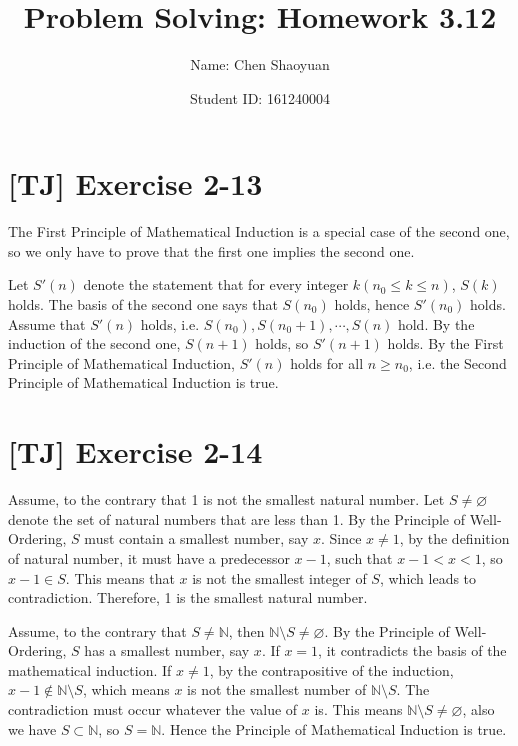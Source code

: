 \documentclass[a4paper,11pt,twocolumn]{article}
\newcommand{\homeworkno}{3.12}
\begin{document}
  \title{Problem Solving: Homework \homeworkno}
  \author{Name: Chen Shaoyuan \and Student ID: 161240004}
  \maketitle

  \section{[TJ] Exercise 2-13}
  The First Principle of Mathematical Induction is a special case of the second one, so we only have to prove that the first one implies the second one. \par
  Let $S'(n)$ denote the statement that for every integer $k (n_0 \leq k \leq n)$, $S(k)$ holds. The basis of the second one says that $S(n_0)$ holds, hence $S'(n_0)$ holds. Assume that $S'(n)$ holds, i.e. $S(n_0), S(n_0 + 1), \cdots, S(n)$ hold. By the induction of the second one, $S(n+1)$ holds, so $S'(n+1)$ holds. By the First Principle of Mathematical Induction, $S'(n)$ holds for all $n \geq n_0$, i.e. the Second Principle of Mathematical Induction is true.

  \section{[TJ] Exercise 2-14}
  Assume, to the contrary that 1 is not the smallest natural number. Let $S \neq \varnothing$ denote the set of natural numbers that are less than 1. By the Principle of Well-Ordering, $S$ must contain a smallest number, say $x$. Since $x \neq 1$, by the definition of natural number, it must have a predecessor $x-1$, such that $x-1 < x < 1$, so $x - 1 \in S$. This means that $x$ is not the smallest integer of $S$, which leads to contradiction. Therefore, 1 is the smallest natural number. \par
  Assume, to the contrary that $S \neq \mathbb{N}$, then $\mathbb{N} \setminus S \neq \varnothing$. By the Principle of Well-Ordering, $S$ has a smallest number, say $x$. If $x = 1$, it contradicts the basis of the mathematical induction. If $x \neq 1$, by the contrapositive of the induction, $x-1 \notin \mathbb{N} \setminus S$, which means $x$ is not the smallest number of $\mathbb{N} \setminus S$. The contradiction must occur whatever the value of $x$ is. This means $\mathbb{N} \setminus S \neq \varnothing$, also we have $S \subset \mathbb{N}$, so $S = \mathbb{N}$. Hence the Principle of Mathematical Induction is true.
\end{document}
